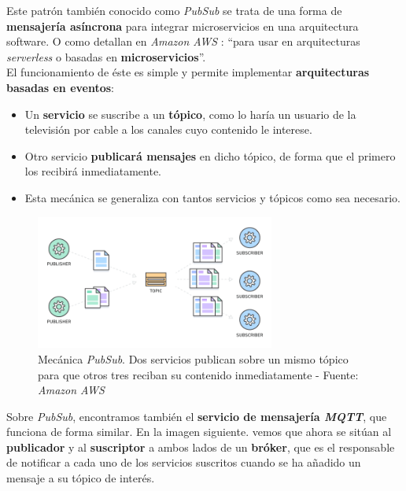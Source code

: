 Este patrón también conocido como \textit{PubSub} se trata de una forma de \textbf{mensajería asíncrona} para integrar microservicios en una arquitectura software. O como detallan en \textit{Amazon AWS} \cite{whats-pubsub}: ``para usar en arquitecturas \textit{serverless} o basadas en \textbf{microservicios}''.\\

El funcionamiento de éste es simple y permite implementar \textbf{arquitecturas basadas en eventos}:

\begin{itemize}
	\item Un \textbf{servicio} se suscribe a un \textbf{tópico}, como lo haría un usuario de la televisión por cable a los canales cuyo contenido le interese.
	\item Otro servicio \textbf{publicará mensajes} en dicho tópico, de forma que el primero los recibirá inmediatamente.
	\item Esta mecánica se generaliza con tantos servicios y tópicos como sea necesario.
\end{itemize}

\begin{figure}[h]
	\centering
	\includegraphics[width=0.7\textwidth]{imagenes/pubsub.png}
	\caption{Mecánica \textit{PubSub}. Dos servicios publican sobre un mismo tópico para que otros tres reciban su contenido inmediatamente - Fuente: \textit{Amazon AWS} \cite{whats-pubsub}}
	\label{pubsub-img}
\end{figure}

Sobre \textit{PubSub}, encontramos también el \textbf{servicio de mensajería \textit{MQTT}}, que funciona de forma similar. En la imagen siguiente. vemos que ahora se sitúan al \textbf{publicador} y al \textbf{suscriptor} a ambos lados de un \textbf{bróker}, que es el responsable de notificar a cada uno de los servicios suscritos cuando se ha añadido un mensaje a su tópico de interés.\\

